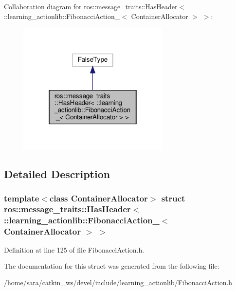 Collaboration diagram for ros\+:\+:message\+\_\+traits\+:\+:Has\+Header$<$ \+:\+:learning\+\_\+actionlib\+:\+:Fibonacci\+Action\+\_\+$<$ Container\+Allocator $>$ $>$\+:
\nopagebreak
\begin{figure}[H]
\begin{center}
\leavevmode
\includegraphics[width=214pt]{structros_1_1message__traits_1_1HasHeader_3_01_1_1learning__actionlib_1_1FibonacciAction___3_01Cb2066eaa05e288c1900a3e13298609bc}
\end{center}
\end{figure}


\subsection{Detailed Description}
\subsubsection*{template$<$class Container\+Allocator$>$\newline
struct ros\+::message\+\_\+traits\+::\+Has\+Header$<$ \+::learning\+\_\+actionlib\+::\+Fibonacci\+Action\+\_\+$<$ Container\+Allocator $>$ $>$}



Definition at line 125 of file Fibonacci\+Action.\+h.



The documentation for this struct was generated from the following file\+:\begin{DoxyCompactItemize}
\item 
/home/sara/catkin\+\_\+ws/devel/include/learning\+\_\+actionlib/Fibonacci\+Action.\+h\end{DoxyCompactItemize}
